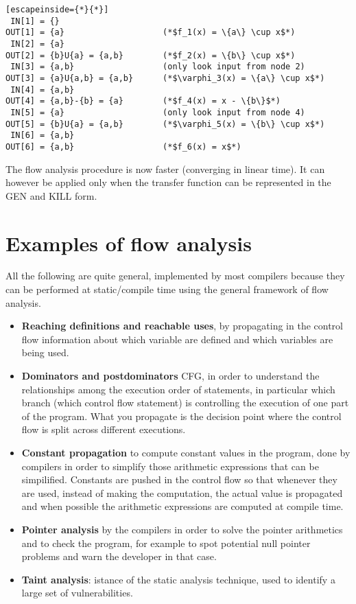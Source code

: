 \documentclass[a4paper, 10pt, titlepage]{article}
\begin{document}
\begin{lstlisting}[escapeinside={*}{*}]
 IN[1] = {}
OUT[1] = {a}					(*$f_1(x) = \{a\} \cup x$*)
 IN[2] = {a}
OUT[2] = {b}U{a} = {a,b}		(*$f_2(x) = \{b\} \cup x$*)
 IN[3] = {a,b}					(only look input from node 2)
OUT[3] = {a}U{a,b} = {a,b}		(*$\varphi_3(x) = \{a\} \cup x$*)
 IN[4] = {a,b}
OUT[4] = {a,b}-{b} = {a}		(*$f_4(x) = x - \{b\}$*)
 IN[5] = {a}					(only look input from node 4)
OUT[5] = {b}U{a} = {a,b}		(*$\varphi_5(x) = \{b\} \cup x$*)
 IN[6] = {a,b}
OUT[6] = {a,b}					(*$f_6(x) = x$*)
\end{lstlisting}
The flow analysis procedure is now faster (converging in linear time). It can however be applied only when the transfer function can be represented in the GEN and KILL form.

\section*{Examples of flow analysis}
All the following are quite general, implemented by most compilers because they can be performed at static/compile time using the general framework of flow analysis.
\begin{itemize}
\item \textbf{Reaching definitions and reachable uses}, by propagating in the control flow information about which variable are defined and which variables are being used.
\item \textbf{Dominators and postdominators} CFG, in order to understand the relationships among the execution order of statements, in particular which branch (which control flow statement) is controlling the execution of one part of the program. What you propagate is the decision point where the control flow is split across different executions.
\item \textbf{Constant propagation} to compute constant values in the program, done by compilers in order to simplify those arithmetic expressions that can be simpilified. Constants are pushed in the control flow so that whenever they are used, instead of making the computation, the actual value is propagated and when possible the arithmetic expressions are computed at compile time.
\item \textbf{Pointer analysis} by the compilers in order to solve the pointer arithmetics and to check the program, for example to spot potential null pointer problems and warn the developer in that case.
\item \textbf{Taint analysis}: istance of the static analysis technique, used to identify a large set of vulnerabilities.
\end{itemize}
\end{document}
